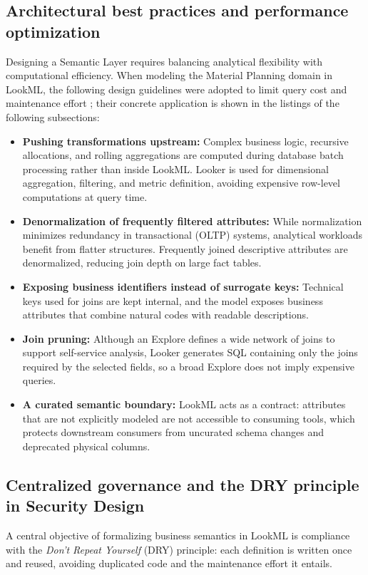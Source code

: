 \subsection{Architectural best practices and performance optimization}
Designing a Semantic Layer requires balancing analytical flexibility with computational efficiency.
When modeling the Material Planning domain in LookML, the following design guidelines were adopted to limit query cost and maintenance effort \cite{googlecloudlookerbp2024};
their concrete application is shown in the listings of the following subsections:
\begin{itemize}
    \item \textbf{Pushing transformations upstream:} Complex business logic, recursive allocations, and rolling aggregations are computed
    during database batch processing rather than inside LookML.
    Looker is used for dimensional aggregation, filtering, and metric definition, avoiding expensive row-level computations at query time.
    \item \textbf{Denormalization of frequently filtered attributes:} While normalization minimizes redundancy in transactional (OLTP) systems,
    analytical workloads benefit from flatter structures. Frequently joined descriptive attributes are denormalized,
    reducing join depth on large fact tables.
    \item \textbf{Exposing business identifiers instead of surrogate keys:} Technical keys used for joins are kept internal,
    and the model exposes business attributes that combine natural codes with readable descriptions.
    \item \textbf{Join pruning:} Although an Explore defines a wide network of joins to support self-service analysis,
    Looker generates SQL containing only the joins required by the selected fields, so a broad Explore does not imply expensive queries.
    \item \textbf{A curated semantic boundary:} LookML acts as a contract: attributes that are not explicitly modeled are not accessible to consuming tools,
    which protects downstream consumers from uncurated schema changes and deprecated physical columns.
\end{itemize}

\subsection{Centralized governance and the DRY principle in Security Design}
A central objective of formalizing business semantics in LookML is compliance with the \textit{Don't Repeat Yourself} (DRY) principle:
each definition is written once and reused, avoiding duplicated code and the maintenance effort it entails.

